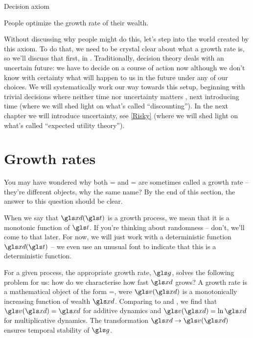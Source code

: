 \begin{keypts}{Decision axiom}

People optimize the growth rate of their wealth.

\end{keypts}

Without discussing why people might do this, let's step into the world created by this axiom. To do that, we need to be crystal clear about what a growth rate is, so we'll discuss that first, in . Traditionally, decision theory deals with an uncertain future: we have to decide on
a course of action now although we don't know with certainty what will happen to us in the future under any
of our choices. We will systematically work our way towards this setup, beginning with trivial decisions where neither time nor uncertainty matters , next introducing time  (where we will shed light on what's called ``discounting''). In the next chapter we will introduce uncertainty, see \cref{Risky} (where we will shed light on what's called ``expected utility theory'').

%
\section{Growth rates}

You may have wondered why both 
\be
\gad=\frac{\xd(\t+\Dt)- \xd(\t)}{\Dt}
\ee
 and 
\be
\gexp= \frac{\ln \xd(\t+\Dt)-\ln \xd(\t)}{\Dt}
\ee
are sometimes called a growth rate -- they're different objects, why the same name? By the end of this section, the answer to this question should be clear.

When we say that $\xd(\t)$ is a growth process, we mean that it is a monotonic function of $\t$. If you're thinking about randomness -- don't, we'll come to that later. For now, we will just work with a deterministic function $\xd(\t)$ -- we even use an unusual font to indicate that this is a deterministic function.

For a given process, the appropriate growth rate, $\g$, solves the following problem for us: how do we characterise how fast $\xd$ grows?
A growth rate is a mathematical object of the form
\be
\g=\frac{\D\gv(\xd)}{\Dt},
\ee
were $\gv(\xd)$ is a monotonically increasing function of wealth $\xd$. Comparing to  and , we find that $\gv(\xd)=\xd$ for additive dynamics and $\gv(\xd)=\ln \xd$ for multiplicative dynamics. The transformation $\xd \to \gv(\xd)$ ensures temporal stability of $\g$.

